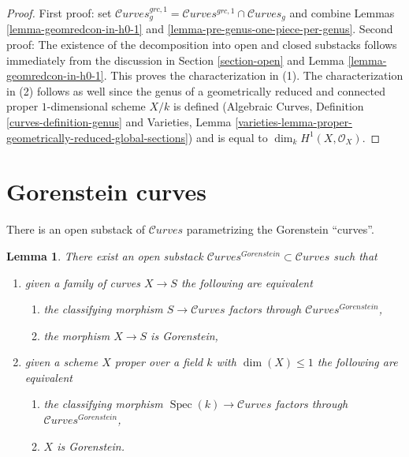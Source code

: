 \documentclass{stacks-project}
\theoremstyle{plain}
\newtheorem{lemma}[subsection]{Lemma}
\theoremstyle{definition}
\theoremstyle{remark}
\numberwithin{equation}{subsection}
\def\Spec{\mathop{\mathrm{Spec}}}
\def\Curvesstack{\mathcal{C}\!\mathit{urves}}
\begin{document}
\begin{proof}
First proof: set
$\Curvesstack^{grc, 1}_g = \Curvesstack^{grc, 1} \cap \Curvesstack_g$
and combine Lemmas \ref{lemma-geomredcon-in-h0-1} and
\ref{lemma-pre-genus-one-piece-per-genus}.
Second proof:
The existence of the decomposition into open and closed substacks
follows immediately from the discussion in Section \ref{section-open}
and Lemma \ref{lemma-geomredcon-in-h0-1}.
This proves the characterization in (1).
The characterization in (2) follows as well since
the genus of a geometrically reduced and connected
proper $1$-dimensional scheme $X/k$ is defined
(Algebraic Curves, Definition \ref{curves-definition-genus} and
Varieties, Lemma
\ref{varieties-lemma-proper-geometrically-reduced-global-sections})
and is equal to $\dim_k H^1(X, \mathcal{O}_X)$.
\end{proof}







\section{Gorenstein curves}
\label{section-gorenstein}

\noindent
There is an open substack of $\Curvesstack$ parametrizing
the Gorenstein ``curves''.

\begin{lemma}
\label{lemma-gorenstein-curves}
There exist an open substack $\Curvesstack^{Gorenstein} \subset \Curvesstack$
such that
\begin{enumerate}
\item given a family of curves $X \to S$ the following are equivalent
\begin{enumerate}
\item the classifying morphism $S \to \Curvesstack$ factors
through $\Curvesstack^{Gorenstein}$,
\item the morphism $X \to S$ is Gorenstein,
\end{enumerate}
\item given a scheme $X$ proper over a field $k$ with $\dim(X) \leq 1$
the following are equivalent
\begin{enumerate}
\item the classifying morphism $\Spec(k) \to \Curvesstack$ factors
through $\Curvesstack^{Gorenstein}$,
\item $X$ is Gorenstein.
\end{enumerate}
\end{enumerate}
\end{lemma}
\end{document}
